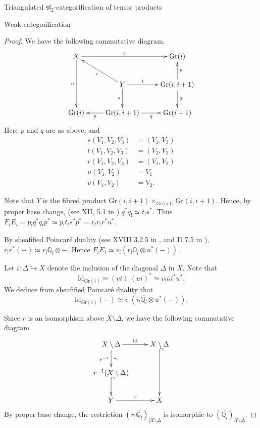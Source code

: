 \documentclass[12pt]{amsart}
\theoremstyle{definition}
\theoremstyle{remark}
\theoremstyle{remark}
\begin{document}
\begin{section}{Triangulated $\mathfrak{sl}_{2}$-categorification of tensor products}
\begin{subsection}{Weak categorification}
\begin{proof}
We have the following commutative diagram. \[ \xymatrix{ X \ar[rr]^-{v} \ar[dd]_-{u} &  & \text{Gr}(i) \\ & Y \ar[ul]^-{r} \ar[r]^-{t} \ar[d]_-{s} & \text{Gr}(i,i+1) \ar[u]_-{p} \ar[d]^-{q} \\ \text{Gr}(i) & \text{Gr}(i,i+1) \ar[l]^-{p} \ar[r]_-{q} & \text{Gr}(i+1) } \] Here $p$ and $q$ are as above, and \begin{align*} s(V_{1},V_{2},V_{3}) &= (V_{1},V_{3}) \\ t(V_{1},V_{2},V_{3}) &= (V_{2},V_{3}) \\ r(V_{1},V_{2},V_{3}) &= (V_{1},V_{2}) \\ u(V_{1},V_{2}) &=V_{1} \\ v(V_{1},V_{2}) &= V_{2}. \end{align*} 

Note that $Y$ is the fibred product $\text{Gr}(i,i+1) \times_{\text{Gr(i+1)}} \text{Gr}(i,i+1)$. Hence, by proper base change, (see XII, 5.1 in \cite{ArtinDeligneGrothendieckSaintDonatVerdierSGA4Tome3}) $q^{*}q_{!} \simeq t_{!}s^{*}$. Thus $F_{i}E_{i} = p_{!}q^{*}q_{!}p^{*} \simeq p_{!}t_{!}s^{*}p^{*} = v_{!}r_{!}r^{*}u^{*}$. 

By sheafified Poincar\'e duality (see XVIII 3.2.5 in \cite{ArtinDeligneGrothendieckSaintDonatVerdierSGA4Tome3}, and II 7.5 in \cite{KiehlWeissauerWeilConjecturesPerverseSheaveslAdicFourierTransform}), $r_{!}r^{*}(-) \simeq r_{!}\overline{\mathbb{Q}_{l}} \otimes -$. Hence $F_{i}E_{i} \simeq v_{!}(r_{!} \overline{\mathbb{Q}_{l}} \otimes u^{*}(-))$. 

Let $i \colon \Delta \hookrightarrow X$ denote the inclusion of the diagonal $\Delta$ in $X$. Note that \[ \text{Id}_{\text{Gr}(i)} \simeq (vi)_{!}(ui)^{*} \simeq v_{!}i_{!}i^{*}u^{*}. \] We deduce from sheafified Poincar\'e duality that \[ \text{Id}_{\text{Gr}(i)}(-) \simeq v_{!}(i_{!} \overline{\mathbb{Q}_{l}} \otimes u^{*}(-)). \] 

Since $r$ is an isomorphism above $X \setminus \Delta$, we have the following commutative diagram. \[ \xymatrix{ X \setminus \Delta \ar[r]^{\text{id}} \ar[d]_{r^{-1}}^{\sim} & X \setminus \Delta \ar@{^{(}->}[dd] \\ r^{-1}(X \setminus \Delta) \ar@{^{(}->}[d] & \\ Y \ar[r]^{r} & X  } \] By proper base change, the restriction $(r_{!} \overline{\mathbb{Q}_{l}})_{\left| X \setminus \Delta \right.}$ is isomorphic to $(\overline{\mathbb{Q}_{l}})_{X \setminus \Delta}$.


\end{proof}
\end{subsection}
\end{section}
\end{document}
